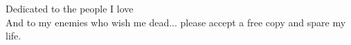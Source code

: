 \thispagestyle{empty}
\vspace*{1.5in}
Dedicated to the people I love \\

And to my enemies who wish me dead... please accept a free copy and spare my life.


